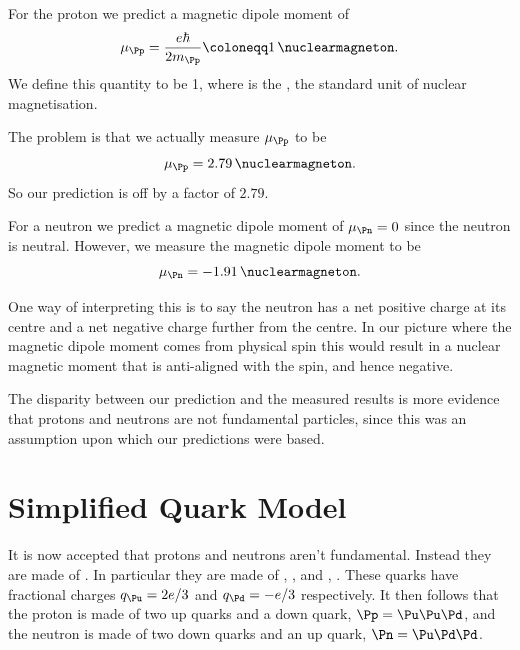 \documentclass[fleqn]{NotesClass}
\begin{document}
    For the proton we predict a magnetic dipole moment of
    \begin{equation}
        \mu_{\Pp} = \frac{e\hbar}{2m_{\Pp}} \coloneqq \qty{1}{\nuclearmagneton}.
    \end{equation}
    We define this quantity to be \qty{1}{\nuclearmagneton}, where \unit{\nuclearmagneton} is the , the standard unit of nuclear magnetisation.
    
    The problem is that we actually measure \(\mu_{\Pp}\) to be
    \begin{equation}
        \mu_{\Pp} = \qty{2.79}{\nuclearmagneton}.
    \end{equation}
    So our prediction is off by a factor of \(2.79\).
    
    For a neutron we predict a magnetic dipole moment of \(\mu_{\Pn} = 0\) since the neutron is neutral.
    However, we measure the magnetic dipole moment to be
    \begin{equation}
        \mu_{\Pn} = \qty{-1.91}{\nuclearmagneton}.
    \end{equation}
    
    One way of interpreting this is to say the neutron has a net positive charge at its centre and a net negative charge further from the centre.
    In our picture where the magnetic dipole moment comes from physical spin this would result in a nuclear magnetic moment that is anti-aligned with the spin, and hence negative.
    
    The disparity between our prediction and the measured results is more evidence that protons and neutrons are not fundamental particles, since this was an assumption upon which our predictions were based.
    
    \section{Simplified Quark Model}
    It is now accepted that protons and neutrons aren't fundamental.
    Instead they are made of .
    In particular they are made of , \Pu, and , \Pd.
    These quarks have fractional charges \(q_{\Pu} = 2e/3\) and \(q_{\Pd} = -e/3\) respectively.
    It then follows that the proton is made of two up quarks and a down quark, \(\Pp = \Pu\Pu\Pd\), and the neutron is made of two down quarks and an up quark, \(\Pn = \Pu\Pd\Pd\).
    
\end{document}
